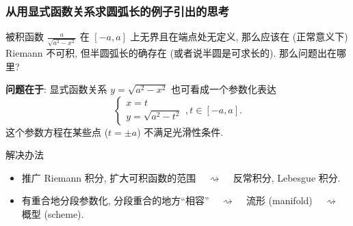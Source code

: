 
\begin{frame}
\frametitle{从用显式函数关系求圆弧长的例子引出的思考}

\begin{question}
被积函数 $\frac{a}{\sqrt{a^2 - x^2}}$ 在 $[-a, a]$ 上无界且在端点处无定义, 那么应该在 (正常意义下) Riemann 不可积, 但半圆弧长的确存在 (或者说半圆是可求长的). 那么问题出在哪里?
\end{question}

\pause

\textbf{问题在于}: 显式函数关系 $y = \sqrt{a^2 - x^2}$ 也可看成一个参数化表达
\[
\begin{cases} x = t \\[3pt] y = \sqrt{a^2 - t^2} \end{cases}, t \in [-a, a].
\]
这个参数方程在某些点 ($t = \pm a$) 不满足光滑性条件.

\pause

\begin{block}{解决办法}
\begin{itemize}
\item 推广 Riemann 积分, 扩大可积函数的范围 \pause  ~ $\rightsquigarrow$ ~ 反常积分, Lebesgue 积分.
\pause
\item 有重合地分段参数化, 分段重合的地方``相容'' \pause ~ $\rightsquigarrow$ ~ 流形 (manifold) ~ $\rightsquigarrow$ ~ 概型 (scheme).
\end{itemize}
\end{block}

\end{frame}


